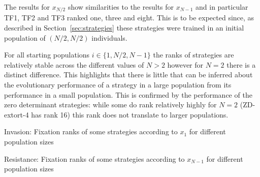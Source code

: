 \documentclass{article}
\begin{document}
The results for \(x_{N/2}\) show similarities to the results for \(x_{N-1}\) and
in particular TF1, TF2 and TF3 ranked one, three and eight. This is to be
expected since, as described in Section~\ref{sec:strategies} these strategies
were trained in an initial population of \((N/2, N/2)\) individuals.

For all starting populations
\(i\in\{1, N/2, N-1\}\) the ranks of strategies are relatively stable across the
different values of \(N>2\) however for \(N=2\) there is a distinct difference.
This highlights that there is little that can be inferred about the evolutionary
performance of a strategy in a large population from its performance in a small
population. This is confirmed by the performance of the zero determinant strategies: while
some do rank relatively highly for \(N=2\) (ZD-extort-4 has rank 16) this rank
does not translate to larger populations.

\begin{table}[!hbtp]
    \centering
    \scriptsize
    
    \caption{Invasion: Fixation ranks of some strategies according to \(x_1\) for different
    population sizes}
    \label{tbl:ranks_v_size_invade}
\end{table}

\begin{table}[!hbtp]
    \centering
    \scriptsize
    
    \caption{Resistance: Fixation ranks of some strategies according to \(x_{N-1}\) for different
    population sizes}
    \label{tbl:ranks_v_size_resist}
\end{table}
\end{document}
